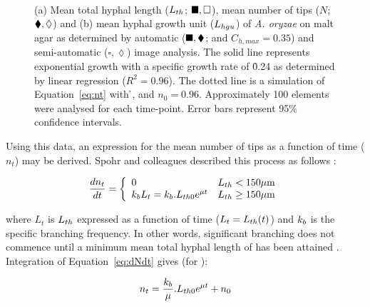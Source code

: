 \begin{figure}[htbp]
	\centering
	\captionsetup[subfloat]{position=top}
	\\
  \caption{(a) Mean total hyphal length ($L_{th}$; $\blacksquare, \square$), mean number of tips ($N$; $\blacklozenge, \lozenge$) and (b) mean hyphal growth unit ($L_{hgu}$) of \emph{A. oryzae} on malt agar as determined by automatic ($\blacksquare,\blacklozenge$;  and $C_{h, max} = 0.35$) and semi-automatic ($\square, \lozenge$) image analysis. The solid line represents exponential growth with a specific growth rate of \h{0.24} as determined by linear regression ($R^2=0.96$). The dotted line is a simulation of Equation~\ref{eq:nt} with \h{},  and $n_0=0.96$. Approximately 100 elements were analysed for each time-point. Error bars represent 95\% confidence intervals.}
  \label{fig:ThlNtLhguT}
\end{figure}

Using this data, an expression for the mean number of tips as a function of time ($n_t$) may be derived. Spohr and colleagues described this process as follows \cite{spohr1997}:

\begin{equation}\label{eq:dNdt}
	\frac{d n_t}{dt} = \left\{ \begin{array}{ll} 0 & L_{th} < 150 \mu \mbox{m} \\ k_b L_t = k_b . L_{th0} e^{\mu t} & L_{th} \geq 150 \mu \mbox{m} \end{array} \right.
\end{equation}

\noindent where $L_t$ is $L_{th}$ expressed as a function of time ($L_t = L_{th}(t)$) and $k_b$ is the specific branching frequency. In other words, significant branching does not commence until a minimum mean total hyphal length of  has been attained \cite{carlsen1996a}. Integration of Equation~\ref{eq:dNdt} gives (for ):

\begin{equation}\label{eq:nt}
	n_t = \frac{k_b}{\mu} . L_{th0} e^{\mu t} + n_0
\end{equation}

